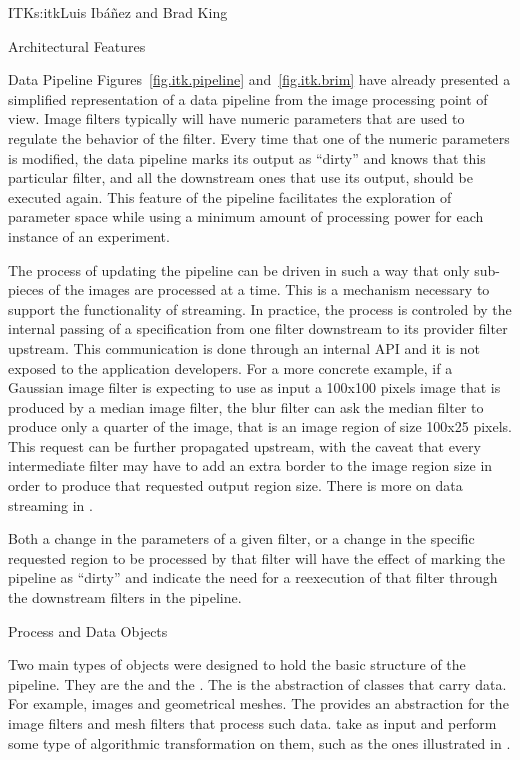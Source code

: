 \begin{aosachapter}{ITK}{s:itk}{Luis Ib\'{a}\~{n}ez and Brad King}
\begin{aosasect1}{Architectural Features}
\begin{aosasect2}{Data Pipeline}
Figures~\ref{fig.itk.pipeline} and~\ref{fig.itk.brim} have already presented a
simplified representation of a data pipeline from the image processing point of
view. Image filters typically will have numeric parameters that are used to
regulate the behavior of the filter. Every time that one of the numeric
parameters is modified, the data pipeline marks its output as ``dirty'' and
knows that this particular filter, and all the downstream ones that use its
output, should be executed again. This feature of the pipeline facilitates the
exploration of  parameter space while using a minimum amount of
processing power for each instance of an experiment.

The process of updating the pipeline can be driven in such a way that only
sub-pieces of the images are processed at a time. This is a mechanism necessary
to support the functionality of streaming. In practice, the process is
controled by the internal passing of a  specification
from one filter downstream to its provider filter upstream. This communication
is done through an internal API and it is not exposed to the application
developers. For a more concrete example, if a Gaussian image filter is
expecting to use as input a 100x100 pixels image that is produced by a median
image filter, the blur filter can ask the median filter to produce only a
quarter of the image, that is an image region of size 100x25 pixels.  This
request can be further propagated upstream, with the caveat that every
intermediate filter may have to add an extra border to the image region size in
order to produce that requested output region size.
There is more on data streaming in .

Both a change in the parameters of a given filter, or a change in the
specific requested region to be processed by that filter will have the
effect of marking the pipeline as ``dirty'' and indicate the need for
a reexecution of that filter through the downstream filters in the pipeline.

\begin{aosasect3}{Process and Data Objects}

Two main types of objects were designed to hold the basic structure of the
pipeline.  They are the  and the . The
 is the abstraction of classes that carry data. For example,
images and geometrical meshes. The  provides an abstraction
for the image filters and mesh filters that process such data.
 take  as input and perform some type of
algorithmic transformation on them, such as the ones illustrated in
.


\end{aosasect3}
\end{aosasect2}
\end{aosasect1}
\end{aosachapter}
